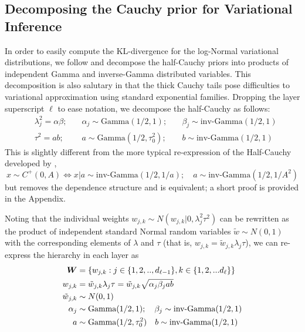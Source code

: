 \subsection{Decomposing the Cauchy prior for Variational Inference}
\label{subsec:ch3-decompose}

In order to easily compute the KL-divergence for the log-Normal variational distributions, we follow \citet{louizos2017bayesian} and decompose the half-Cauchy priors into products of independent Gamma and inverse-Gamma distributed variables.  This decomposition is also salutary in that the thick Cauchy tails pose difficulties to variational approximation using standard exponential families.  Dropping the layer superscript $\ell$ to ease notation, we decompose the half-Cauchy as follows:
\begin{equation}
    \begin{aligned}
        &\lambda_j^2 = \alpha\beta;  
            &\quad \alpha_j \sim \text{Gamma} (1/2, 1); 
            &\quad \beta_j \sim \text{inv-Gamma} (1/2, 1)
        \\
        &\tau^2 = a b;
            &\quad a \sim \text{Gamma} (1/2, \tau_0^2); 
            &\quad b \sim \text{inv-Gamma} (1/2, 1)
    \end{aligned}
\end{equation}
This is slightly different from the more typical re-expression of the Half-Cauchy developed by \citet{wand_variational_nodate},
\begin{equation}
    x \sim C^+(0, A) 
        \iff 
        x|a \sim \text{inv-Gamma} \left( 1/2, 1/a \right);
        \quad 
        a \sim \text{inv-Gamma} \left( 1/2, 1/A^2 \right)
\end{equation}
but removes the dependence structure and is equivalent; a short proof is provided in the Appendix. 

Noting that the individual weights $w_{j,k} \sim N(w_{j,k} | 0, \lambda^2_{j} \tau^2)$ can be rewritten as the product of independent standard Normal random variables $\tilde{w} \sim N(0,1)$ with the corresponding elements of $\lambda$ and $\tau$ (that is, $w_{j,k} = \tilde{w}_{j,k} \lambda_j \tau$), we can re-express the hierarchy in each layer as
\begin{equation}
    \begin{aligned}
        \bm{W} 
            & = 
            \left\{ 
              w_{j,k}: j \in \{1, 2, .., d_{\ell-1} \}, 
                       k \in \{1, 2, ... d_\ell \}
            \right\}
        \\
    w_{j, k}
        & = \tilde{w}_{j, k} \lambda_{j} \tau
        = \tilde{w}_{j, k} \sqrt{\alpha_{j} \beta_{j} a b}
        \\
    \tilde{w}_{j, k}
        & \sim N(0, 1)
        \\
    \alpha_{j} 
        & \sim \text{Gamma} (1/2, 1);
        \quad 
        \beta_j \sim \text{inv-Gamma} (1/2, 1)
        \\
    a 
        & \sim \text{Gamma} (1/2, \tau_0^2)
        \quad 
        b
        \sim \text{inv-Gamma} (1/2, 1)
    \end{aligned}
    \label{eq:cauchydecomp}
\end{equation}




